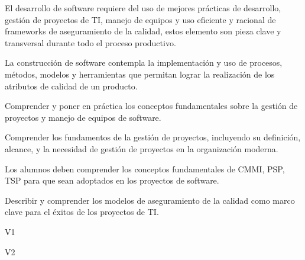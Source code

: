 \begin{syllabus}


\begin{justification}
El desarrollo de software requiere del uso de mejores prácticas de desarrollo, gestión de proyectos de TI, manejo de equipos 
y uso eficiente y racional de frameworks de aseguramiento de la calidad, estos elemento son pieza clave y transversal durante 
todo el proceso productivo.

La construcción de software contempla la implementación y uso de procesos, métodos, modelos y herramientas que permitan lograr 
la realización de los atributos de calidad de un producto.
\end{justification}

\begin{goals}
  \item Comprender y poner en práctica los conceptos fundamentales sobre la gestión de proyectos y manejo de equipos de software.
  \item Comprender los fundamentos de la gestión de proyectos, incluyendo su definición, alcance, y la necesidad de gestión de proyectos en la organización moderna.
  \item Los alumnos deben comprender los conceptos fundamentales de CMMI, PSP, TSP para que sean adoptados en los proyectos de software.
  \item Describir y comprender los modelos de aseguramiento de la calidad como marco clave para el éxitos de los proyectos de TI.
\end{goals}

\begin{outcomes}{V1}
    \item {}
    \item {}
    \item {}
    \item {}
    \item {}
    \item {}
\end{outcomes}

\begin{outcomes}{V2}
    \item {}
    \item {}
    \item {}
\end{outcomes}


\end{syllabus}
